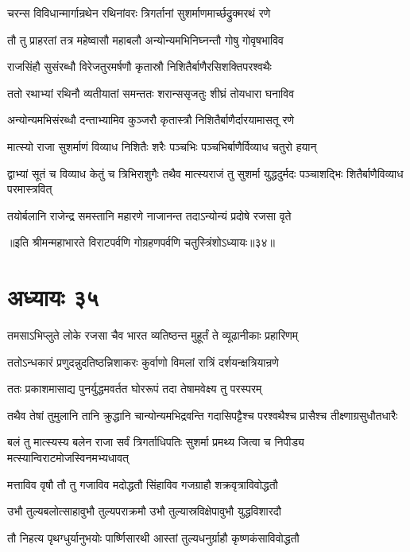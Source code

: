\twolineshloka
{चरन्स विविधान्मार्गान्रथेन रथिनांवरः}
{त्रिगर्तानां सुशर्माणमार्च्छद्रुक्मरथं रणे}


\twolineshloka
{तौ तु प्राहरतां तत्र महेष्वासौ महाबलौ}
{अन्योन्यमभिनिघ्नन्तौ गोषु गोवृषभाविव}


\twolineshloka
{राजसिंहौ सुसंरब्धौ विरेजतुरमर्षणौ}
{कृतास्रौ निशितैर्बाणैरसिशक्तिपरश्वथैः}


\twolineshloka
{ततो रथाभ्यां रथिनौ व्यतीयातां समन्ततः}
{शरान्ससृजतुः शीघ्रं तोयधारा घनाविव}


\twolineshloka
{अन्योन्यमभिसंरब्धौ दन्ताभ्यामिव कुञ्जरौ}
{कृतास्त्रौ निशितैर्बाणैर्दारयामासतू रणे}


\twolineshloka
{मात्स्यो राजा सुशर्माणं विव्याध निशितैः शरैः}
{पञ्चभिः पञ्चभिर्बाणैर्विव्याध चतुरो हयान्}


\threelineshloka
{द्वाभ्यां सूतं च विव्याध केतुं च त्रिभिराशुगैः}
{तथैव मात्स्यराजं तु सुशर्मा युद्धदुर्मदः}
{पञ्चाशद्भिः शितैर्बाणैविव्याध परमास्त्रवित्}


\twolineshloka
{तयोर्बलानि राजेन्द्र समस्तानि महारणे}
{नाजानन्त तदाऽन्योन्यं प्रदोषे रजसा वृते}

॥इति श्रीमन्महाभारते विराटपर्वणि गोग्रहणपर्वणि चतुस्त्रिंशोऽध्यायः॥३४॥

\chapter{अध्यायः ३५}

\twolineshloka
{तमसाऽभिप्लुते लोके रजसा चैव भारत}
{व्यतिष्ठन्त मुहूर्तं ते व्यूढानीकाः प्रहारिणम्}


\twolineshloka
{ततोऽन्धकारं प्रणुदन्नुदतिष्ठन्निशाकरः}
{कुर्वाणो विमलां रात्रिं दर्शयन्क्षत्रियान्रणे}


\twolineshloka
{ततः प्रकाशमासाद्य पुनर्युद्धमवर्तत}
{घोररूपं तदा तेषामवेक्ष्य तु परस्परम्}


\twolineshloka
{तथैव तेषां तुमुलानि तानि क्रुद्धानि चान्योन्यमभिद्रवन्ति}
{गदासिपट्टैश्च परश्वथैश्च प्रासैश्च तीक्ष्णाग्रसुधौतधारैः}


\twolineshloka
{बलं तु मात्स्यस्य बलेन राजा सर्वं त्रिगर्ताधिपतिः सुशर्मा}
{प्रमथ्य जित्वा च निपीड्य मत्स्यान्विराटमोजस्विनमभ्यधावत्}


\twolineshloka
{मत्ताविव वृषौ तौ तु गजाविव मदोद्धतौ}
{सिंहाविव गजग्राहौ शक्रवृत्राविवोद्धतौ}


\twolineshloka
{उभौ तुल्यबलोत्साहावुभौ तुल्यपराक्रमौ}
{उभौ तुल्यास्रविक्षेपावुभौ युद्धविशारदौ}


\twolineshloka
{तौ निहत्य पृथग्धुर्यानुभयोः पार्ष्णिसारथी}
{आस्तां तुल्यधनुर्ग्राहौ कृष्णकंसाविवोद्धतौ}


